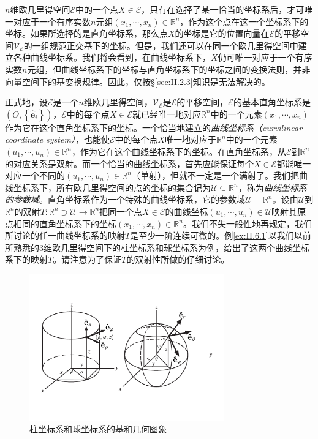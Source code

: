 \documentclass[../main.tex]{subfiles}
\begin{document}
$n$维欧几里得空间$\mathcal{E}$中的一个点$X\in\mathcal{E}$，只有在选择了某一恰当的坐标系后，才可唯一对应于一个有序实数$n$元组$\left(x_1,\cdots,x_n\right)\in\mathbb{R}^n$，作为这个点在这一个坐标系下的坐标。如果所选择的是直角坐标系，那么点$X$的坐标是它的位置向量在$\mathcal{E}$的平移空间$\mathcal{V}_\mathcal{E}$的一组规范正交基下的坐标。但是，我们还可以在同一个欧几里得空间中建立各种曲线坐标系。我们将会看到，在曲线坐标系下，$X$仍可唯一对应于一个有序实数$n$元组，但曲线坐标系下的坐标与直角坐标系下的坐标之间的变换法则，并非向量空间下的基变换规律。因此，仅按\S\ref{sec:II.2.3}知识是无法解决的。

正式地，设$\mathcal{E}$是一个$n$维欧几里得空间，$\mathcal{V}_\mathcal{E}$是$\mathcal{E}$的平移空间，$\mathcal{E}$的基本直角坐标系是$\left(O,\left\{\mathbf{\hat{e}}_i\right\}\right)$，$\mathcal{E}$中的每个点$X\in\mathcal{E}$就已经唯一地对应$\mathbb{R}^n$中的一个元素$\left(x_1,\cdots,x_n\right)$作为它在这个直角坐标系下的坐标。一个恰当地建立的\emph{曲线坐标系（curvilinear coordinate system）}，也能使$\mathcal{E}$中的每个点$X$唯一地对应于$\mathbb{R}^n$中的一个元素$\left(u_1,\cdots,u_n\right)\in\mathbb{R}^n$，作为它在这个曲线坐标系下的坐标。在直角坐标系，从$\mathcal{E}$到$\mathbb{R}^n$的对应关系是双射。而一个恰当的曲线坐标系，首先应能保证每个$X\in\mathcal{E}$都能唯一对应一个不同的$\left(u_1,\cdots,u_n\right)\in\mathbb{R}^n$（单射），但就不一定是一个满射了。我们把曲线坐标系下，所有欧几里得空间的点的坐标的集合记为$\mathcal{U}\subseteq\mathbb{R}^n$，称为\emph{曲线坐标系的参数域}。直角坐标系作为一个特殊的曲线坐标系，它的参数域$\mathcal{U}=\mathbb{R}^n$。设由$\mathcal{U}$到$\mathbb{R}^n$的双射$T:\mathbb{R}^n\supset\mathcal{U}\rightarrow\mathbb{R}^n$把同一个点$X\in\mathcal{E}$的曲线坐标$\left(u_1,\cdots,u_n\right)\in\mathcal{U}$映射其原点相同的直角坐标系下的坐标$\left(x_1,\cdots,x_n\right)\in\mathbb{R}^n$。我们不失一般性地再规定，我们所讨论的任一曲线坐标系的映射$T$是至少一阶连续可微的。例\ref{ex:II.6.1}以我们以前所熟悉的3维欧几里得空间下的柱坐标系和球坐标系为例，给出了这两个曲线坐标系下的映射$T$。请注意为了保证$T$的双射性所做的仔细讨论。

\begin{figure}[h]
    \centering
    \includegraphics[width=0.75\textwidth]{images/cylindrical_spherical_coordinate_basis.pdf}
    \caption{柱坐标系和球坐标系的基和几何图象}
    \label{fig:II.5.2}
\end{figure}
\end{document}
